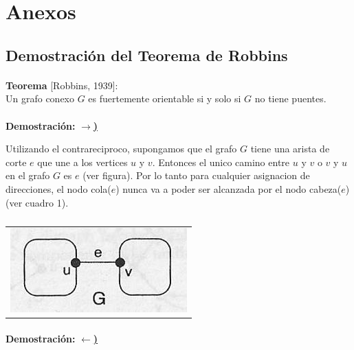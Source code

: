 \section{Anexos}

\subsection{Demostración del Teorema de Robbins}
\label{demostraciones2}

\paragraph{}
\textbf{Teorema} [Robbins, 1939]:\\
Un grafo conexo $G$ es fuertemente orientable si y solo si $G$ no tiene puentes.

\paragraph{} 
\textbf{Demostración:} \underline{\textbf{$\rightarrow$)}}

Utilizando el contrareciproco, supongamos que el grafo $G$ tiene una arista de corte $e$ que une a los vertices $u$ y $v$. Entonces el unico camino entre $u$ y $v$  o $v$ y $u$ en el grafo $G$ es $e$ (ver figura). Por lo tanto para cualquier asignacion de direcciones, el nodo cola($e$) nunca va a poder ser alcanzada por el nodo cabeza($e$) (ver cuadro 1).

	\begin{table}[h!] %
		\centering %
			\begin{tabular}{c}
				\includegraphics[scale=0.7]{./otros/figura1.jpg} 

				\end{tabular}
				\caption{} %
				\label{} %
	\end{table}

\paragraph{} 
\textbf{Demostración:} \underline{\textbf{$\leftarrow$)}}

